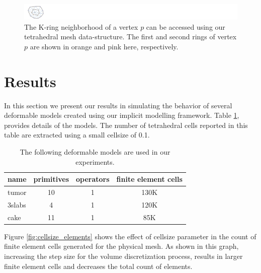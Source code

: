  \begin{figure}[H]
  \centering
  \includegraphics[width=7.0\linewidth]{figures/deformable/kring.pdf}
  \caption{\label{fig:kring}
  {The K-ring neighborhood of a vertex $p$ can be accessed using our tetrahedral mesh 
  data-structure. The first and second rings of vertex $p$ are shown in orange and pink here, respectively.}
}
\end{figure}


\section{Results}
In this section we present our results in simulating the behavior of several deformable models created 
using our implicit modelling framework. Table \ref{table:deformablemodels}, provides details of the 
models. The number of tetrahedral cells reported in this table are extracted using a small cellsize of 0.1. 

\begin{table}[H]
\begin{center}
\caption{\label{table:deformablemodels}
{The following deformable models are used in our experiments.}}
  \begin{tabular}{ | l | c | c | c | }
    \hline    
    name & primitives & operators & finite element cells \\ \hline \hline    
    tumor & 10 & 1 & 130K \\ \hline
    3slabs & 4 & 1 & 120K \\ \hline
    cake & 11 & 1 & 85K \\ \hline
    \hline
  \end{tabular}
\end{center}
\end{table}

Figure \ref{fig:cellsize_elements} shows the effect of cellsize parameter in the count of finite element 
cells generated for the physical mesh. As shown in this graph, increasing the step size for the volume 
discretization process, results in larger finite element cells and decreases the total count of elements.

